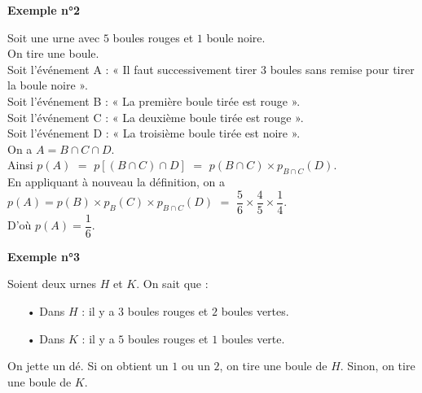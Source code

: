 \textbf{Exemple n°2} 

Soit une urne avec $5$ boules rouges et $1$ boule noire. \\ On tire une boule. \\

Soit l'événement A : « Il faut successivement tirer $3$ boules sans remise pour tirer la boule noire ». \\
Soit l'événement B : « La première boule tirée est rouge ». \\
Soit l'événement C : « La deuxième boule tirée est rouge ». \\
Soit l'événement D : « La troisième boule tirée est noire ». \\

On a $A = B \cap C \cap D$. \\

Ainsi $p\left(A\right)$ $=$ $p\left[\left(B\cap C\right) \cap D\right]$ $=$ $p\left(B \cap C\right) \times p_{B \cap C}\left(D\right)$. \vspace*{.3cm} \\

En appliquant à nouveau la définition, on a $p\left(A\right) = p\left(B\right) \times p_B\left(C\right) \times p_{B\cap C}\left(D\right)$ $=$ $\dfrac{5}{6} \times \dfrac{4}{5} \times \dfrac{1}{4}$. \vspace*{.3cm} \\

D'où $p\left(A\right) = \dfrac{1}{6}$. 

\vspace*{-5cm}

\newpage

\vspace*{-1.5cm}

\textbf{Exemple n°3} 

Soient deux urnes $H$ et $K$. On sait que : \\

\begin{itemize}
\item[•] Dans $H$ : il y a $3$ boules rouges et $2$ boules vertes. 
\item[•] Dans $K$ : il y a $5$ boules rouges et $1$ boules verte. 
\end{itemize}

\vspace*{.3cm}

On jette un dé. Si on obtient un $1$ ou un $2$, on tire une boule de $H$. Sinon, on tire une boule de $K$. \\


